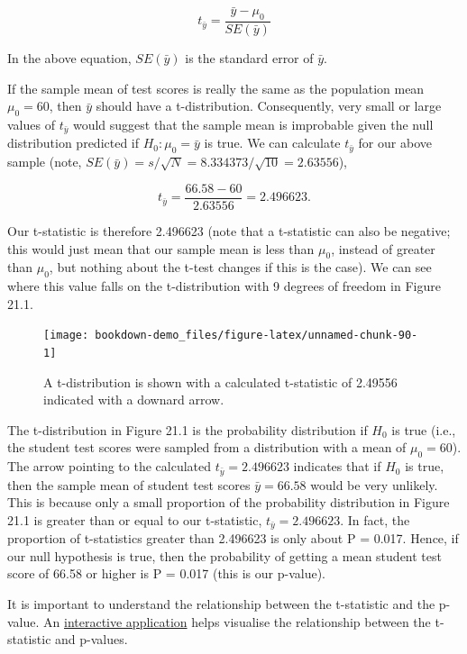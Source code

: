 \documentclass[
]{scrbook}
\begin{document}
\[t_{\bar{y}} = \frac{\bar{y} - \mu_{0}}{SE(\bar{y})}\]

In the above equation, \(SE(\bar{y})\) is the standard error of \(\bar{y}\).

If the sample mean of test scores is really the same as the population mean \(\mu_{0} = 60\), then \(\bar{y}\) should have a t-distribution.
Consequently, very small or large values of \(t_{\bar{y}}\) would suggest that the sample mean is improbable given the null distribution predicted if \(H_{0}: \mu_{0} = \bar{y}\) is true.
We can calculate \(t_{\bar{y}}\) for our above sample (note, \(SE(\bar{y}) = s/\sqrt{N} = 8.334373 / \sqrt{10} = 2.63556\)),

\[t_{\bar{y}} = \frac{66.58 - 60}{2.63556} = 2.496623.\]

Our t-statistic is therefore 2.496623 (note that a t-statistic can also be negative; this would just mean that our sample mean is less than \(\mu_{0}\), instead of greater than \(\mu_{0}\), but nothing about the t-test changes if this is the case).
We can see where this value falls on the t-distribution with 9 degrees of freedom in Figure 21.1.

\begin{figure}
\texttt{[image: bookdown-demo\_files/figure-latex/unnamed-chunk-90-1]} \caption{A t-distribution is shown with a calculated t-statistic of 2.49556 indicated with a downard arrow.}\label{fig:unnamed-chunk-90}
\end{figure}

The t-distribution in Figure 21.1 is the probability distribution if \(H_{0}\) is true (i.e., the student test scores were sampled from a distribution with a mean of \(\mu_{0} = 60\)).
The arrow pointing to the calculated \(t_{\bar{y}} = 2.496623\) indicates that if \(H_{0}\) is true, then the sample mean of student test scores \(\bar{y} = 66.58\) would be very unlikely.
This is because only a small proportion of the probability distribution in Figure 21.1 is greater than or equal to our t-statistic, \(t_{\bar{y}} = 2.496623\).
In fact, the proportion of t-statistics greater than 2.496623 is only about P = 0.017.
Hence, if our null hypothesis is true, then the probability of getting a mean student test score of 66.58 or higher is P = 0.017 (this is our p-value).

It is important to understand the relationship between the t-statistic and the p-value.
An \href{https://bradduthie.shinyapps.io/t_score/}{interactive application} helps visualise the relationship between the t-statistic and p-values.
\end{document}
